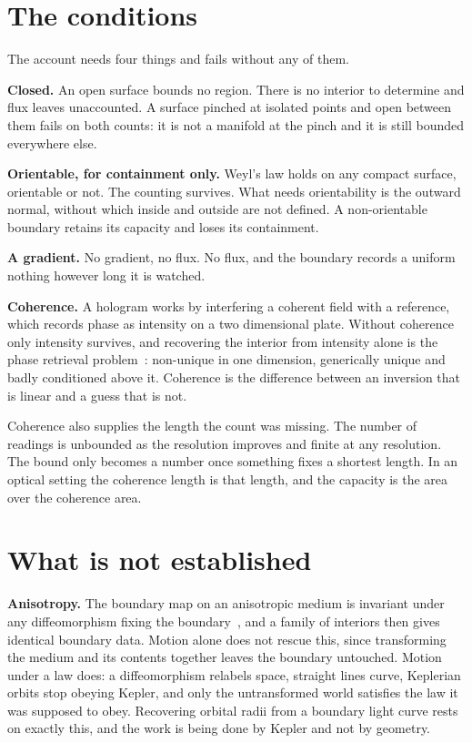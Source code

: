 \section{The conditions}

The account needs four things and fails without any of them.

\textbf{Closed.} An open surface bounds no region. There is no interior to determine and flux leaves unaccounted. A surface pinched at isolated points and open between them fails on both counts: it is not a manifold at the pinch and it is still bounded everywhere else.

\textbf{Orientable, for containment only.} Weyl's law holds on any compact surface, orientable or not. The counting survives. What needs orientability is the outward normal, without which inside and outside are not defined. A non-orientable boundary retains its capacity and loses its containment.

\textbf{A gradient.} No gradient, no flux. No flux, and the boundary records a uniform nothing however long it is watched.

\textbf{Coherence.} A hologram works by interfering a coherent field with a reference, which records phase as intensity on a two dimensional plate. Without coherence only intensity survives, and recovering the interior from intensity alone is the phase retrieval problem~\cite{src:Bruck-and-Sodin-1979,src:Hayes-1982}: non-unique in one dimension, generically unique and badly conditioned above it. Coherence is the difference between an inversion that is linear and a guess that is not.

Coherence also supplies the length the count was missing. The number of readings is unbounded as the resolution improves and finite at any resolution. The bound only becomes a number once something fixes a shortest length. In an optical setting the coherence length is that length, and the capacity is the area over the coherence area.

\section{What is not established}

\textbf{Anisotropy.} The boundary map on an anisotropic medium is invariant under any diffeomorphism fixing the boundary~\cite{src:Lee-and-Uhlmann-1989}, and a family of interiors then gives identical boundary data. Motion alone does not rescue this, since transforming the medium and its contents together leaves the boundary untouched. Motion under a law does: a diffeomorphism relabels space, straight lines curve, Keplerian orbits stop obeying Kepler, and only the untransformed world satisfies the law it was supposed to obey. Recovering orbital radii from a boundary light curve rests on exactly this, and the work is being done by Kepler and not by geometry.

